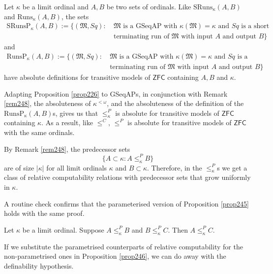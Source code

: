 \documentclass[12pt]{article}
\numberwithin{equation}{section}
\begin{document}
Let $\kappa$ be a limit ordinal and $A, B$ be two sets of ordinals. Like $\mathrm{SRuns}_{\kappa}(A, B)$ and $\mathrm{Runs}_{\kappa}(A, B)$, the sets
\begin{align*}
    \mathrm{SRunsP}_{\kappa}(A, B) := \{(\mathfrak{M}, Sq) : \ & \mathfrak{M} \text{ is a GSeqAP with } \kappa(\mathfrak{M}) = \kappa \text{ and } Sq \text{ is a short} \\
    & \text{terminating run of } \mathfrak{M} \text{ with input } A \text{ and output } B\}
\end{align*}
and
\begin{align*}
    \mathrm{RunsP}_{\kappa}(A, B) := \{(\mathfrak{M}, Sq) : \ & \mathfrak{M} \text{ is a GSeqAP with } \kappa(\mathfrak{M}) = \kappa \text{ and } Sq \text{ is a} \\
    & \text{terminating run of } \mathfrak{M} \text{ with input } A \text{ and output } B\}
\end{align*}
have absolute definitions for transitive models of $\mathsf{ZFC}$ containing $A, B$ and $\kappa$. 

Adapting Proposition \ref{prop226} to GSeqAPs, in conjunction with Remark \ref{rem248}, the absoluteness of $\kappa^{< \omega}$, and the absoluteness of the definition of the $\mathrm{RunsP}_{\kappa}(A, B)$s, gives us that $\leq^P_{\kappa}$ is absolute for transitive models of $\mathsf{ZFC}$ containing $\kappa$. As a result, like $\leq^C$, $\leq^P$ is absolute for transitive models of $\mathsf{ZFC}$ with the same ordinals. 

By Remark \ref{rem248}, the predecessor sets
\begin{equation*}
    \{A \subset \kappa : A \leq^P_{\kappa} B\}
\end{equation*}
are of size $|\kappa|$ for all limit ordinals $\kappa$ and $B \subset \kappa$. Therefore, in the $\leq^P_{\kappa}$s we get a class of relative computability relations with predecessor sets that grow uniformly in $\kappa$.

A routine check confirms that the parameterised version of Proposition \ref{prop245} holds with the same proof.

\begin{prop}\label{prop251}
Let $\kappa$ be a limit ordinal. Suppose $A \leq^P_{\kappa} B$ and $B \leq^P_{\kappa} C$. Then $A \leq^P_{\kappa} C$.
\end{prop}

If we substitute the parametrised counterparts of relative computability for the non-parametrised ones in Proposition \ref{prop246}, we can do away with the definability hypothesis.
\end{document}
